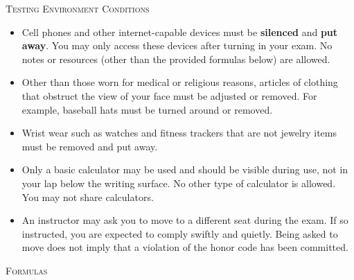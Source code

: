 \noindent \textsc{Testing Environment Conditions}
\begin{small}
\begin{itemize}
\item Cell phones and other internet-capable devices must be \textbf{silenced} and \textbf{put away}. You may only access these devices after turning in your exam. No notes or resources (other than the provided formulas below) are allowed.
\item Other than those worn for medical or religious reasons, articles of clothing that obstruct the view of your face must be adjusted or removed. For example, baseball hats must be turned around or removed.
\item Wrist wear such as watches and fitness trackers that are not jewelry items must be removed and put away.
\item Only a basic calculator may be used and should be visible during use, not in your lap below the writing surface. No other type of calculator is allowed. You may not share calculators.
\item An instructor may ask you to move to a different seat during the exam. If so instructed, you are expected to comply swiftly and quietly. Being asked to move does not imply that a violation of the honor code has been committed.\\
\end{itemize}
\end{small}

\noindent \textsc{Formulas}

